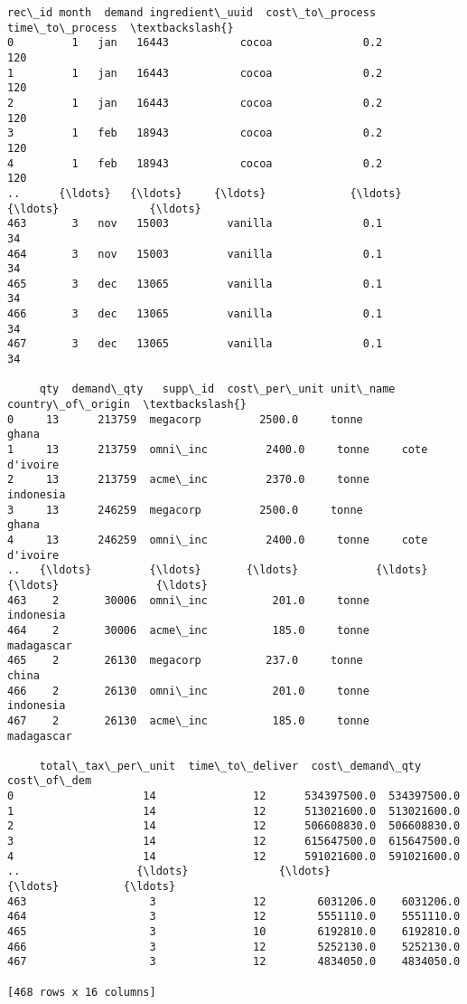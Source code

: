 \documentclass[11pt]{article}
\makeatletter
\newcommand{\boxspacing}{\kern\kvtcb@left@rule\kern\kvtcb@boxsep}
\newcommand{\prompt}[4]{
        {\ttfamily\llap{{\color{#2}[#3]:\hspace{3pt}#4}}\vspace{-\baselineskip}}
    }
\makeatother
\begin{document}
            \begin{tcolorbox}[breakable, size=fbox, boxrule=.5pt, pad at break*=1mm, opacityfill=0]
\prompt{Out}{outcolor}{12}{\boxspacing}
\begin{Verbatim}[commandchars=\\\{\}]
     rec\_id month  demand ingredient\_uuid  cost\_to\_process  time\_to\_process  \textbackslash{}
0         1   jan   16443           cocoa              0.2              120
1         1   jan   16443           cocoa              0.2              120
2         1   jan   16443           cocoa              0.2              120
3         1   feb   18943           cocoa              0.2              120
4         1   feb   18943           cocoa              0.2              120
..      {\ldots}   {\ldots}     {\ldots}             {\ldots}              {\ldots}              {\ldots}
463       3   nov   15003         vanilla              0.1               34
464       3   nov   15003         vanilla              0.1               34
465       3   dec   13065         vanilla              0.1               34
466       3   dec   13065         vanilla              0.1               34
467       3   dec   13065         vanilla              0.1               34

     qty  demand\_qty   supp\_id  cost\_per\_unit unit\_name country\_of\_origin  \textbackslash{}
0     13      213759  megacorp         2500.0     tonne             ghana
1     13      213759  omni\_inc         2400.0     tonne     cote d'ivoire
2     13      213759  acme\_inc         2370.0     tonne         indonesia
3     13      246259  megacorp         2500.0     tonne             ghana
4     13      246259  omni\_inc         2400.0     tonne     cote d'ivoire
..   {\ldots}         {\ldots}       {\ldots}            {\ldots}       {\ldots}               {\ldots}
463    2       30006  omni\_inc          201.0     tonne         indonesia
464    2       30006  acme\_inc          185.0     tonne        madagascar
465    2       26130  megacorp          237.0     tonne             china
466    2       26130  omni\_inc          201.0     tonne         indonesia
467    2       26130  acme\_inc          185.0     tonne        madagascar

     total\_tax\_per\_unit  time\_to\_deliver  cost\_demand\_qty  cost\_of\_dem
0                    14               12      534397500.0  534397500.0
1                    14               12      513021600.0  513021600.0
2                    14               12      506608830.0  506608830.0
3                    14               12      615647500.0  615647500.0
4                    14               12      591021600.0  591021600.0
..                  {\ldots}              {\ldots}              {\ldots}          {\ldots}
463                   3               12        6031206.0    6031206.0
464                   3               12        5551110.0    5551110.0
465                   3               10        6192810.0    6192810.0
466                   3               12        5252130.0    5252130.0
467                   3               12        4834050.0    4834050.0

[468 rows x 16 columns]
\end{Verbatim}
\end{tcolorbox}
\end{document}
